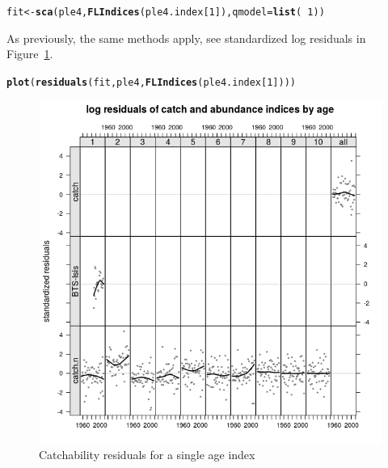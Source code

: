 \documentclass[a4paper,english,10pt]{article}\usepackage[]{graphicx}\usepackage[]{color}
\makeatletter
\def\maxwidth{ %
  \ifdim\Gin@nat@width>\linewidth
    \linewidth
  \else
    \Gin@nat@width
  \fi
}
\newcommand{\hlnum}[1]{\textcolor[rgb]{0.686,0.059,0.569}{#1}}%
\newcommand{\hlopt}[1]{\textcolor[rgb]{0,0,0}{#1}}%
\newcommand{\hlstd}[1]{\textcolor[rgb]{0.345,0.345,0.345}{#1}}%
\newcommand{\hlkwb}[1]{\textcolor[rgb]{0.69,0.353,0.396}{#1}}%
\newcommand{\hlkwc}[1]{\textcolor[rgb]{0.333,0.667,0.333}{#1}}%
\newcommand{\hlkwd}[1]{\textcolor[rgb]{0.737,0.353,0.396}{\textbf{#1}}}%
\newenvironment{kframe}{%
 \def\at@end@of@kframe{}%
 \ifinner\ifhmode%
  \def\at@end@of@kframe{\end{minipage}}%
  \begin{minipage}{\columnwidth}%
 \fi\fi%
 \def\FrameCommand##1{\hskip\@totalleftmargin \hskip-\fboxsep
 \colorbox{shadecolor}{##1}\hskip-\fboxsep
     \hskip-\linewidth \hskip-\@totalleftmargin \hskip\columnwidth}%
 \MakeFramed {\advance\hsize-\width
   \@totalleftmargin\z@ \linewidth\hsize
   \@setminipage}}%
 {\par\unskip\endMakeFramed%
 \at@end@of@kframe}
\newenvironment{knitrout}{}{} %
\makeatother
\begin{document}
\begin{knitrout}
\color{fgcolor}\begin{kframe}
\begin{alltt}
\hlstd{fit} \hlkwb{<-} \hlkwd{sca}\hlstd{(ple4,} \hlkwd{FLIndices}\hlstd{(ple4.index[}\hlnum{1}\hlstd{]),} \hlkwc{qmodel} \hlstd{=} \hlkwd{list}\hlstd{(}\hlopt{~}\hlnum{1}\hlstd{))}
\end{alltt}
\end{kframe}
\end{knitrout}

As previously, the same methods apply, see standardized log residuals in Figure~\ref{fig:resrec}.

\begin{knitrout}
\color{fgcolor}\begin{kframe}
\begin{alltt}
\hlkwd{plot}\hlstd{(}\hlkwd{residuals}\hlstd{(fit, ple4,} \hlkwd{FLIndices}\hlstd{(ple4.index[}\hlnum{1}\hlstd{])))}
\end{alltt}
\end{kframe}\begin{figure}[H]

{\centering \includegraphics[width=\maxwidth]{figure/resrec-1} 

}

\caption[Catchability residuals for a single age index]{Catchability residuals for a single age index}\label{fig:resrec}
\end{figure}


\end{knitrout}
\end{document}
